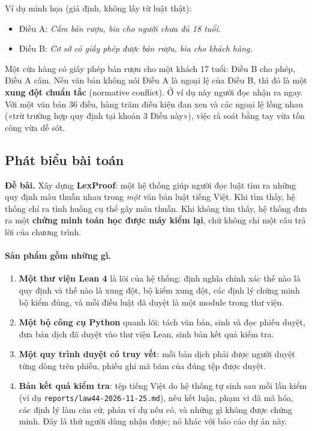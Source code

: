 \documentclass[12pt,a4paper]{article}
\newcommand{\code}[1]{\texttt{#1}}
\newcommand{\term}[1]{\textbf{#1}}
\begin{document}
Ví dụ minh họa (giả định, không lấy từ luật thật):
\begin{itemize}
  \item Điều A: \emph{Cấm bán rượu, bia cho người chưa đủ 18 tuổi.}
  \item Điều B: \emph{Cơ sở có giấy phép được bán rượu, bia cho khách hàng.}
\end{itemize}
Một cửa hàng có giấy phép bán rượu cho một khách 17 tuổi: Điều B cho phép, Điều A cấm. Nếu văn bản không nói Điều A là ngoại
lệ của Điều B, thì đó là một \term{xung đột chuẩn tắc} (normative conflict). Ở ví dụ này người đọc nhận ra ngay. Với một văn
bản 36 điều, hàng trăm điều kiện đan xen và các ngoại lệ lồng nhau («trừ trường hợp quy định tại khoản 3 Điều này»), việc rà
soát bằng tay vừa tốn công vừa dễ sót.

\subsection{Phát biểu bài toán}

\begin{keybox}
\textbf{Đề bài.} Xây dựng \textbf{LexProof}: một hệ thống giúp người đọc luật tìm ra những quy định mâu thuẫn nhau trong
\emph{một} văn bản luật tiếng Việt. Khi tìm thấy, hệ thống chỉ ra tình huống cụ thể gây mâu thuẫn. Khi không tìm thấy, hệ
thống đưa ra một \textbf{chứng minh toán học được máy kiểm lại}, chứ không chỉ một câu trả lời của chương trình.
\end{keybox}

\paragraph{Sản phẩm gồm những gì.}
\begin{enumerate}
  \item \textbf{Một thư viện Lean 4} là lõi của hệ thống: định nghĩa chính xác thế nào là quy định và thế nào là xung đột,
    bộ kiểm xung đột, các định lý chứng minh bộ kiểm đúng, và mỗi điều luật đã duyệt là một module trong thư viện.
  \item \textbf{Một bộ công cụ Python} quanh lõi: tách văn bản, sinh và đọc phiếu duyệt, đưa bản dịch đã duyệt vào thư viện
    Lean, sinh bản kết quả kiểm tra.
  \item \textbf{Một quy trình duyệt có truy vết}: mỗi bản dịch phải được người duyệt từng dòng trên phiếu, phiếu ghi mã băm
    của đúng tệp được duyệt.
  \item \textbf{Bản kết quả kiểm tra}: tệp tiếng Việt do hệ thống tự sinh sau mỗi lần kiểm (ví dụ \code{reports/law44-2026-11-25.md}), nêu kết luận, phạm vi đã mã hóa, các định lý làm căn cứ, phản ví dụ nếu có, và những gì không được chứng minh. Đây là thứ người dùng nhận được; nó khác với báo cáo dự án này.
\end{enumerate}
\end{document}
